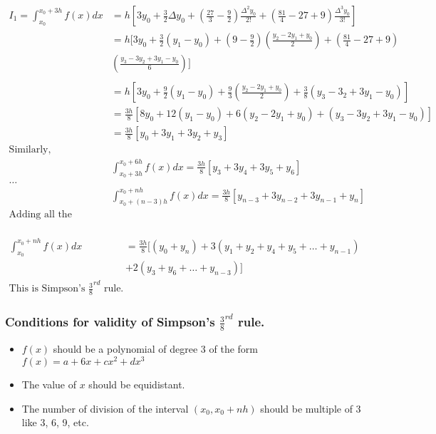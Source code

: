 \documentclass[10pt, twoside, a4paper]{article}
\begin{document}
\begin{align*}
  I_1 = \int_{x_0}^{x_0+3h}f(x)dx &=h[3y_0+\frac{3}{2}\Delta y_0
                                   +(\frac{27}{3}-\frac{9}{2})
                                     \frac{\Delta^2y_0}{2!}
                                   +(\frac{81}{4}-27+9)
                                     \frac{\Delta^3y_0}{3!}]\\
                                  &=h[3y_0+\frac{3}{2}(y_1-y_0)
                                   +(9-\frac{9}{2})(\frac{y_2-2y_1+y_0}{2})
                                   +(\frac{81}{4}-27+9)\\
                                  & (\frac{y_3-3y_2+3y_1-y_0}{6})]\\
                          \ \\
                                  &= h[3y_0+\frac{9}{2}(y_1-y_0)
                                   +\frac{9}{3}(\frac{y_2-2y_1+y_0}{2})
                                   +\frac{3}{8}(y_3-3_2+3y_1-y_0)]\\
                                  &=\frac{3h}{8}[8y_0+12(y_1-y_0)
                                  +6(y_2-2y_1+y_0)+(y_3-3y_2+3y_1-y_0)]\\
                                  &=\frac{3h}{8}[y_0+3y_1+3y_2+y_3]\\
  \text{Similarly,}\\
                                  & \int_{x_0+3h}^{x_0+6h}f(x)dx
                                  =\frac{3h}{8}[y_3+3y_4+3y_5+y_6]\\
  \dots\\
                                  & \int_{x_0+(n-3)h}^{x_0+nh}f(x)dx 
                                  =\frac{3h}{8}[y_{n-3}+3y_{n-2}
                                  +3y_{n-1}+y_n]\\
  \text{Adding all the integrals,}\\
\end{align*}
\begin{tcolorbox}
\begin{align*}
         \int_{x_0}^{x_0+nh}f(x)dx&=\frac{3h}{8}[(y_0+y_n)
                                   +3(y_1+y_2+y_4+y_5+\dots+y_{n-1})\\
                                  &+2(y_3+y_6+\dots+y_{n-3})]\\
  \text{This is Simpson's $\frac{3}{8}^{rd}$ rule.}
\end{align*}
\end{tcolorbox}


\subsubsection{Conditions for validity of Simpson's $\frac{3}{8}^{rd}$ rule.}
\begin{itemize}
  \item $f(x)$ should be a polynomial of degree 3 of the form 
    $f(x)=a+6x+cx^2+dx^3$
  \item The value of $x$ should be equidistant.
  \item The number of division of the interval $(x_0,x_0+nh)$
    should be multiple of 3 like 3, 6, 9, etc.
\end{itemize}
\end{document}
